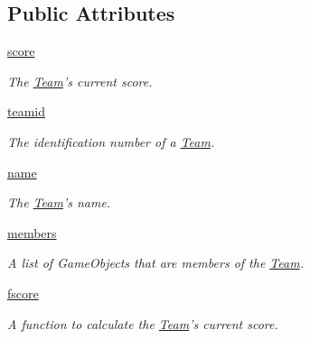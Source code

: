 \subsection*{\-Public \-Attributes}
\begin{DoxyCompactItemize}
\item 
\hypertarget{classTeam_1_1Team_a108717c9daf1d659227c27a94f1fc8a0}{\hyperlink{classTeam_1_1Team_a108717c9daf1d659227c27a94f1fc8a0}{score}}\label{classTeam_1_1Team_a108717c9daf1d659227c27a94f1fc8a0}

\begin{DoxyCompactList}\small\item\em \-The \hyperlink{classTeam_1_1Team}{\-Team}'s current score. \end{DoxyCompactList}\item 
\hypertarget{classTeam_1_1Team_a54bac45272111d4fd74fddf2c23bfa09}{\hyperlink{classTeam_1_1Team_a54bac45272111d4fd74fddf2c23bfa09}{teamid}}\label{classTeam_1_1Team_a54bac45272111d4fd74fddf2c23bfa09}

\begin{DoxyCompactList}\small\item\em \-The identification number of a \hyperlink{classTeam_1_1Team}{\-Team}. \end{DoxyCompactList}\item 
\hypertarget{classTeam_1_1Team_a229f25a8d4687825dbb5756f556c0780}{\hyperlink{classTeam_1_1Team_a229f25a8d4687825dbb5756f556c0780}{name}}\label{classTeam_1_1Team_a229f25a8d4687825dbb5756f556c0780}

\begin{DoxyCompactList}\small\item\em \-The \hyperlink{classTeam_1_1Team}{\-Team}'s name. \end{DoxyCompactList}\item 
\hypertarget{classTeam_1_1Team_a1f45f57ffe8ebf1bfde387167a6859b5}{\hyperlink{classTeam_1_1Team_a1f45f57ffe8ebf1bfde387167a6859b5}{members}}\label{classTeam_1_1Team_a1f45f57ffe8ebf1bfde387167a6859b5}

\begin{DoxyCompactList}\small\item\em \-A list of \-Game\-Objects that are members of the \hyperlink{classTeam_1_1Team}{\-Team}. \end{DoxyCompactList}\item 
\hyperlink{classTeam_1_1Team_a01dc47fa71d0ee9d33a5bbd704d94e5a}{fscore}
\begin{DoxyCompactList}\small\item\em \-A function to calculate the \hyperlink{classTeam_1_1Team}{\-Team}'s current score. \end{DoxyCompactList}\end{DoxyCompactItemize}
